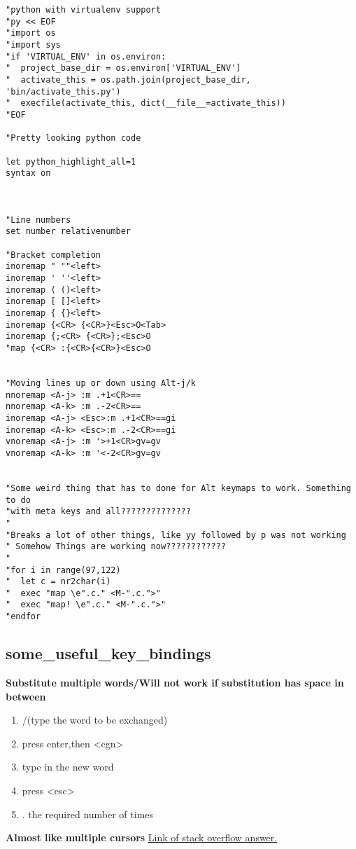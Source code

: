 \begin{lstlisting}
"python with virtualenv support
"py << EOF
"import os
"import sys
"if 'VIRTUAL_ENV' in os.environ:
"  project_base_dir = os.environ['VIRTUAL_ENV']
"  activate_this = os.path.join(project_base_dir, 'bin/activate_this.py')
"  execfile(activate_this, dict(__file__=activate_this))
"EOF

"Pretty looking python code

let python_highlight_all=1
syntax on



"Line numbers
set number relativenumber

"Bracket completion
inoremap " ""<left>
inoremap ' ''<left>
inoremap ( ()<left>
inoremap [ []<left>
inoremap { {}<left>
inoremap {<CR> {<CR>}<Esc>O<Tab>
inoremap {;<CR> {<CR>};<Esc>O
"map {<CR> :{<CR>{<CR>}<Esc>O


"Moving lines up or down using Alt-j/k
nnoremap <A-j> :m .+1<CR>==
nnoremap <A-k> :m .-2<CR>==
inoremap <A-j> <Esc>:m .+1<CR>==gi
inoremap <A-k> <Esc>:m .-2<CR>==gi
vnoremap <A-j> :m '>+1<CR>gv=gv
vnoremap <A-k> :m '<-2<CR>gv=gv


"Some weird thing that has to done for Alt keymaps to work. Something to do
"with meta keys and all??????????????
"
"Breaks a lot of other things, like yy followed by p was not working
" Somehow Things are working now????????????
"
"for i in range(97,122)
"  let c = nr2char(i)
"  exec "map \e".c." <M-".c.">"
"  exec "map! \e".c." <M-".c.">"
"endfor

\end{lstlisting}


\subsection{some_useful_key_bindings}
\textbf{Substitute multiple words/Will not work if substitution has space in between}

\begin{enumerate}
    \item /(type the word to be exchanged)
    \item press enter,then <cgn>
    \item type in the new word
    \item press <esc>
    \item . the required number of times
\end{enumerate}

\textbf{Almost like multiple cursors}
\href{https://stackoverflow.com/questions/11784408/vim-multiline-editing-like-in-sublimetext}{Link of stack overflow answer.}


